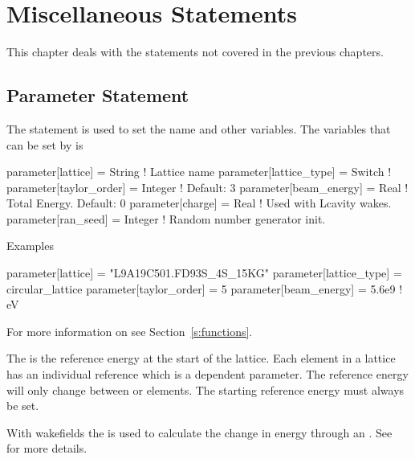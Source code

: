 \chapter{Miscellaneous Statements}

This chapter deals with the statements not covered in the previous chapters.

\section{Parameter Statement}
\label{s:param}


The  statement is used to set the  name and other variables. 
The variables that can be set by  is
\begin{example}
  parameter[lattice]      = String      ! Lattice name 
  parameter[lattice_type] = Switch      ! 
  parameter[taylor_order] = Integer     ! Default: 3
  parameter[beam_energy]  = Real        ! Total Energy. Default: 0
  parameter[charge]       = Real        ! Used with Lcavity wakes. 
  parameter[ran_seed]     = Integer     ! Random number generator init.
\end{example}

\noindent
Examples
\begin{example}
  parameter[lattice]      = "L9A19C501.FD93S_4S_15KG"
  parameter[lattice_type] = circular_lattice
  parameter[taylor_order] = 5
  parameter[beam_energy]  = 5.6e9    ! eV
\end{example}

For more information on  see Section~\ref{s:functions}.

The  is the reference energy at the start of the
lattice.  Each element in a lattice has an individual reference
 which is a dependent parameter. 
The reference energy will only change between  or
 elements. The starting reference energy must always be set.

With wakefields the  is used to calculate the
change in energy through an . See~ for more
details.


